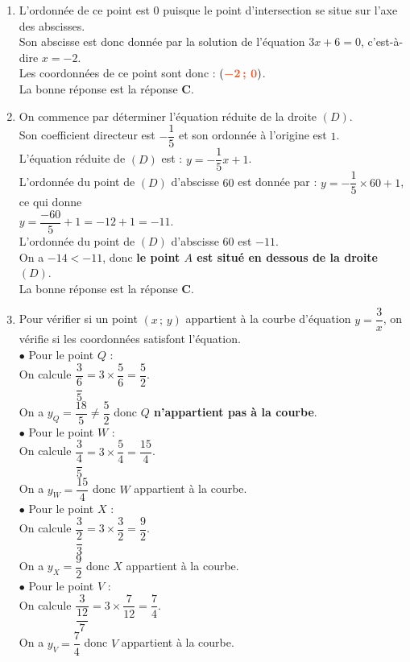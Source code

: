 \documentclass[a4paper,11pt]{article}
\begin{document}
\newpage
\begin{seance}{} %

\begin{enumerate}
\item L'ordonnée de ce point est $0$ puisque le point d'intersection se situe sur l'axe des abscisses.\\
      Son abscisse est donc donnée par la solution de l'équation  $3x+6=0$, c'est-à-dire $x=-2$.
    \\Les coordonnées de ce   point sont donc : $({\color[HTML]{F15929}\boldsymbol{-2\,;\,0}})$.\\La bonne réponse est la réponse {\bfseries \color[HTML]{F15929}C}.

\item On commence par déterminer l'équation réduite de la droite $(D)$.\\
    Son coefficient directeur est $-\dfrac{1}{5}$ et son ordonnée à l'origine est $1$.\\
    L'équation réduite de $(D)$ est : $y=-\dfrac{1}{5}x+1$.\\
    L'ordonnée du point de $(D)$ d'abscisse $60$ est donnée par : $y=-\dfrac{1}{5}\times 60+1$, ce qui donne\\
    $y=\dfrac{-60}{5}+1=-12+1=-11$.\\
    L'ordonnée du point de $(D)$ d'abscisse $60$ est $-11$.\\On a $-14<-11$, donc {\bfseries \color[HTML]{F15929}le point $A$ est situé en dessous de la droite $(D)$}.\\La bonne réponse est la réponse {\bfseries \color[HTML]{F15929}C}.

\item Pour vérifier si un point $(x\,;\,y)$ appartient à la courbe d'équation $y=\dfrac{3}{x}$, on vérifie si les coordonnées satisfont l'équation.\\$\bullet$ Pour le point $Q$ :\\On calcule $\dfrac{3}{\dfrac{6}{5}}=3\times \dfrac{5}{6}=\dfrac{5}{2}$.\\On a $y_{Q}=\dfrac{18}{5}\neq \dfrac{5}{2}$ donc {\bfseries \color[HTML]{F15929}$Q$ n'appartient pas à la courbe}.\\$\bullet$ Pour le point $W$ :\\On calcule $\dfrac{3}{\dfrac{4}{5}}=3\times \dfrac{5}{4}=\dfrac{15}{4}$.\\On a $y_{W}=\dfrac{15}{4}$ donc $W$ appartient à la courbe.\\$\bullet$ Pour le point $X$ :\\On calcule $\dfrac{3}{\dfrac{2}{3}}=3\times \dfrac{3}{2}=\dfrac{9}{2}$.\\On a $y_{X}=\dfrac{9}{2}$ donc $X$ appartient à la courbe.\\$\bullet$ Pour le point $V$ :\\On calcule $\dfrac{3}{\dfrac{12}{7}}=3\times \dfrac{7}{12}=\dfrac{7}{4}$.\\On a $y_{V}=\dfrac{7}{4}$ donc $V$ appartient à la courbe.


\end{enumerate}
\end{seance}
\end{document}
